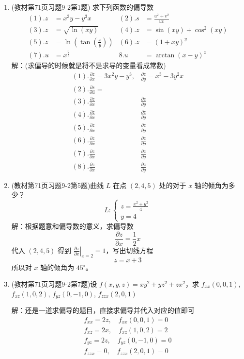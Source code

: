 \begin{enumerate}
\item (教材第71页习题9-2第1题) 求下列函数的偏导数
\begin{align*}
(1). z &= x^3y-y^3x  & (2). s &= \frac{u^2+v^2}{u v} \\
(3). z &= \sqrt{\ln(x y)} &   (4). z &= \sin(x y)  + \cos ^2(x y) \\
(5). z &= \ln(\tan(\frac{x}{y})) & (6). z &= (1+x y)^y \\
(7). u &= x^{\frac{y}{z}} & 8. u &= \arctan (x-y)^z 
\end{align*}
解：(求偏导的时候就是将不是求导的变量看成常数)
\begin{align*}
    (1). \frac{\partial z }{\partial x} = 3x^2y - y^3, & \frac{\partial z }{\partial y} = x^3 - 3y^2 x \\
    (2). \frac{\partial s}{\partial u} = &   \\
    (3). \frac{\partial z}{\partial x} & \frac{\partial z}{\partial y} \\
    (4). \frac{\partial z}{\partial x} & \frac{\partial z}{\partial y} \\
    (5). \frac{\partial z}{\partial x} & \frac{\partial z}{\partial y} \\
    (6). \frac{\partial z}{\partial x} & \frac{\partial z}{\partial y} \\
    (7). \frac{\partial z}{\partial x} & \frac{\partial z}{\partial y} \\
    (8). \frac{\partial z}{\partial x} & \frac{\partial z}{\partial y}
\end{align*}


\item (教材第71页习题9-2第5题)曲线 $L$ 在点 $(2,4,5)$ 处的对于 $x$ 轴的倾角为多少？
$$
L: \left\{\begin{matrix}
z = \frac{x^2+y^2}{4}\\
y = 4
\end{matrix}\right.
$$
解：根据题意和偏导数的意义，求偏导数
\begin{equation*}
    \frac{\partial z}{\partial x} = \frac{1}{2} x
\end{equation*}
代入 $(2,4,5)$ 得到 $ \left. \frac{\partial z}{\partial x} \right|_{x=2} = 1$，写出切线方程
\begin{equation*}
    z = x + 3
\end{equation*}
所以对 $x$ 轴的倾角为 $45 ^ \circ$。

\item (教材第71页习题9-2第7题)设 $f(x,y,z) = x y^2+y z^2+z x^2$，求 $f_{xx}(0,0,1)$, $f_{xz}(1,0,2)$, $f_{yz}(0,-1,0)$, $f_{zzx}(2,0,1)$

解：还是一道求偏导的题目，直接求偏导并代入对应的值即可
\begin{align*}
    f_{xx} = 2z , \quad f_{xx}(0,0,1) = 0 \\
    f_{xz} = 2x , \quad f_{xz}(1,0,2) = 2 \\
    f_{yz} = 2z , \quad f_{yz}(0,-1,0) = 0 \\
    f_{zzx} = 0 , \quad f_{zzx}(2,0,1) = 0
\end{align*}
\end{enumerate}

